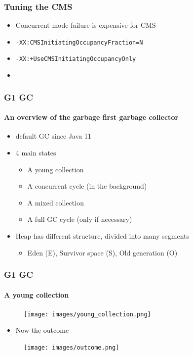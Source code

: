 \documentclass{beamer}
\begin{document}
\begin{frame}
    \frametitle{Tuning the CMS}
    \begin{itemize}
        \item Concurrent mode failure is expensive for CMS
        \item \texttt{-XX:CMSInitiatingOccupancyFraction=N}
        \item \texttt{-XX:+UseCMSInitiatingOccupancyOnly}
        \item 
    \end{itemize}
\end{frame}

\begin{frame}
    \frametitle{G1 GC}
    \framesubtitle{An overview of the garbage first garbage collector}
    \begin{itemize}
        \item default GC since Java 11\cite{noauthor_jdk11usrchotspotsharegcg1_nodate}
        \item 4 main states 
        \begin{itemize}
            \item A young collection
            \item A concurrent cycle (in the background)
            \item A mixed collection
            \item A full GC cycle (only if necessary)
        \end{itemize}
        \item Heap has different structure, divided into many segments
        \begin{itemize}
            \item Eden (E), Survivor space (S), Old generation (O)
        \end{itemize}
    \end{itemize}
    
\end{frame}

\begin{frame}
    \frametitle{G1 GC}
    \framesubtitle{A young collection}
    \begin{figure}
        \texttt{[image: images/young\_collection.png]}
    
    \end{figure}
    \begin{itemize}
        \item Now the outcome
    \end{itemize}
    \begin{figure}
        \texttt{[image: images/outcome.png]}
    
    \end{figure}
    
        
    
\end{frame}
\end{document}
